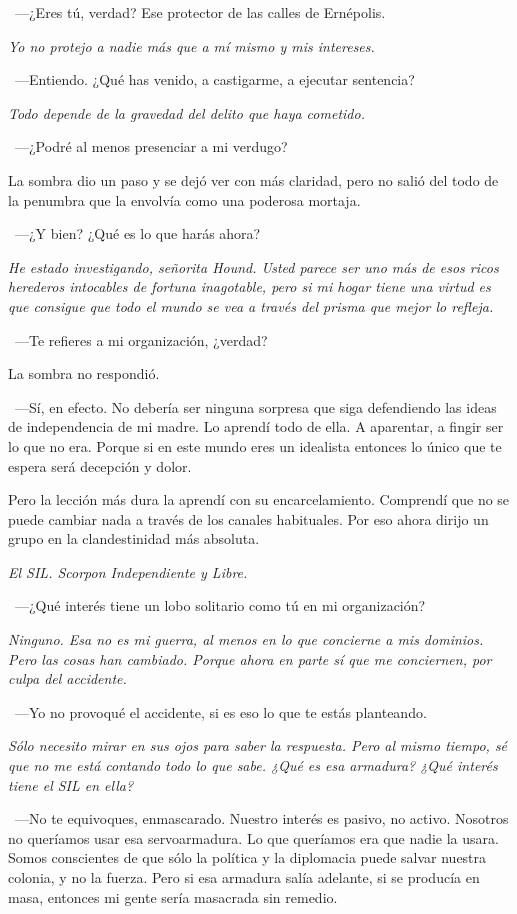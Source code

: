 ~---¿Eres tú, verdad? Ese protector de las calles de Ernépolis.

\emph{Yo no protejo a nadie más que a mí mismo y mis intereses.}

~---Entiendo. ¿Qué has venido, a castigarme, a ejecutar sentencia?

\emph{Todo depende de la gravedad del delito que haya cometido.}

~---¿Podré al menos presenciar a mi verdugo?

La sombra dio un paso y se dejó ver con más claridad, pero no salió del todo de la penumbra que la envolvía como una poderosa mortaja.

~---¿Y bien? ¿Qué es lo que harás ahora?

\emph{He estado investigando, señorita Hound. Usted parece ser uno más de esos ricos herederos intocables de fortuna inagotable, pero si mi hogar tiene una virtud es que consigue que todo el mundo se vea a través del prisma que mejor lo refleja.}

~---Te refieres a mi organización, ¿verdad?

La sombra no respondió.

~---Sí, en efecto. No debería ser ninguna sorpresa que siga defendiendo las ideas de independencia de mi madre. Lo aprendí todo de ella. A aparentar, a fingir ser lo que no era. Porque si en este mundo eres un idealista entonces lo único que te espera será decepción y dolor.

\rquoti Pero la lección más dura la aprendí con su encarcelamiento. Comprendí que no se puede cambiar nada a través de los canales habituales. Por eso ahora dirijo un grupo en la clandestinidad más absoluta.

\emph{El SIL. Scorpon Independiente y Libre.}

~---¿Qué interés tiene un lobo solitario como tú en mi organización?

\emph{Ninguno. Esa no es mi guerra, al menos en lo que concierne a mis dominios. Pero las cosas han cambiado. Porque ahora en parte sí que me conciernen, por culpa del accidente.}

~---Yo no provoqué el accidente, si es eso lo que te estás planteando.

\emph{Sólo necesito mirar en sus ojos para saber la respuesta. Pero al mismo tiempo, sé que no me está contando todo lo que sabe. ¿Qué es esa armadura? ¿Qué interés tiene el SIL en ella?}

~---No te equivoques, enmascarado. Nuestro interés es pasivo, no activo. Nosotros no queríamos usar esa servoarmadura. Lo que queríamos era que nadie la usara. Somos conscientes de que sólo la política y la diplomacia puede salvar nuestra colonia, y no la fuerza. Pero si esa armadura salía adelante, si se producía en masa, entonces mi gente sería masacrada sin remedio.


